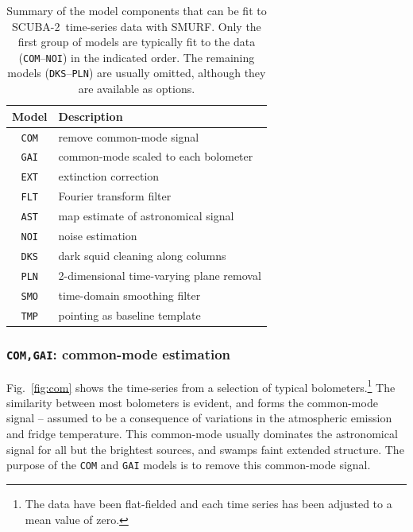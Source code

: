 \documentclass[useAMS,usenatbib,nofootinbib]{mn2e}
\newcommand{\scuba}{SCUBA-2}
\newcommand{\model}[1]{\texttt{#1}}
\begin{document}
\begin{table}
  \caption{Summary of the model components that can be fit to \scuba\
    time-series data with SMURF. Only the first group of models are
    typically fit to the data (\model{COM}--\model{NOI}) in the
    indicated order. The remaining models (\model{DKS}--\model{PLN})
    are usually omitted, although they are available as options.}
  \vspace{0.2cm}
  \centering
  \begin{tabular}{c|l}
    \hline
    Model & Description \\
    \hline
    \model{COM} & remove common-mode signal \\
    \model{GAI} & common-mode scaled to each bolometer \\
    \model{EXT} & extinction correction \\
    \model{FLT} & Fourier transform filter \\
    \model{AST} & map estimate of astronomical signal \\
    \model{NOI} & noise estimation \\
    \hline
    \model{DKS} & dark squid cleaning along columns \\
    \model{PLN} & 2-dimensional time-varying plane removal \\
    \model{SMO} & time-domain smoothing filter \\
    \model{TMP} & pointing as baseline template \\
    \hline
    \end{tabular}
  \label{tab:components}
\end{table}

\subsubsection{\model{COM,GAI}: common-mode estimation}
\label{sec:comgai}

﻿Fig.~\ref{fig:com} shows the time-series from a selection of typical
bolometers.\footnote{The data have been flat-fielded and each time
series has been adjusted to a mean value of zero.} The similarity
between most bolometers is evident, and forms the common-mode signal
-- assumed to be a consequence of variations in the atmospheric
emission and fridge temperature. This common-mode usually dominates
the astronomical signal for all but the brightest sources, and swamps
faint extended structure.  The purpose of the \model{COM} and
\model{GAI} models is to remove this common-mode signal.
\end{document}
